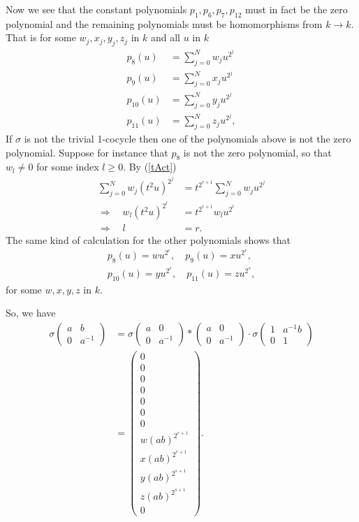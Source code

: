 Now we see that the constant polynomials $p_1,p_6,p_7,p_{12}$ must in fact be the zero polynomial and the remaining polynomials must be homomorphisms from $k\rightarrow k$. That is for some $w_j, x_j, y_j, z_j$ in $k$ and all $u$ in $k$
\begin{align*}
p_8(u) &= \sum_{j=0}^N w_j u^{2^j} \\
p_9(u) &= \sum_{j=0}^N x_j u^{2^j} \\
p_{10}(u) &= \sum_{j=0}^N y_j u^{2^j} \\
p_{11}(u) &= \sum_{j=0}^N z_j u^{2^j}, 
\end{align*}
If $\sigma$ is not the trivial 1-cocycle then one of the polynomials above is not the zero polynomial. Suppose for instance that $p_8$ is not the zero polynomial, so that $w_l\neq 0$ for some index $l\geq 0$. By (\ref{tAct})
\begin{align*}
\sum_{j=0}^N w_j (t^2u)^{2^j} &= t^{2^{r+1}}\sum_{j=0}^N w_j u^{2^j} \\
\Rightarrow\quad w_l (t^2u)^{2^l} &= t^{2^{r+1}} w_l u^{2^l} \\
\Rightarrow\quad l &= r.
\end{align*}
The same kind of calculation for the other polynomials shows that
\begin{align*}
p_8(u) = wu^{2^{r}}, \quad p_9(u) = xu^{2^{r}}, \\
p_{10}(u) = yu^{2^{s}}, \quad p_{11}(u) = zu^{2^{s}},
\end{align*}
for some $w,x,y,z$ in $k$.

So, we have
\begin{align*}
\sigma\left(\begin{matrix} a & b \\ 0 & a^{-1} \end{matrix}\right) &=
\sigma\left(\begin{matrix} a & 0 \\ 0 & a^{-1} \end{matrix}\right) * 
\left(\begin{matrix} a & 0 \\ 0 & a^{-1} \end{matrix}\right)\cdot
\sigma\left(\begin{matrix} 1 & a^{-1}b \\ 0 & 1 \end{matrix}\right) \\
&=
\left( \begin{matrix}
0 \\
0 \\
0 \\
0 \\
0 \\
0 \\
0 \\
w(ab)^{2^{r+1}} \\
x(ab)^{2^{r+1}} \\
y(ab)^{2^{s+1}} \\
z(ab)^{2^{s+1}} \\
0
\end{matrix} \right).
\end{align*}

